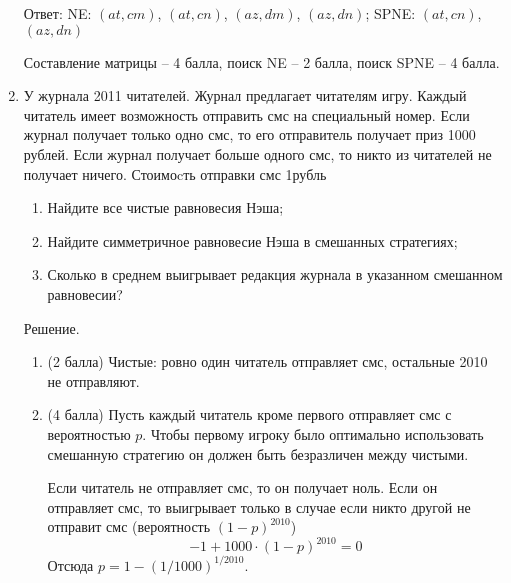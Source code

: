 \documentclass[pdftex,12pt,a4paper]{article}
\begin{document}
\begin{enumerate}

Ответ: NE: $(at,cm)$, $(at,cn)$, $(az,dm)$, $(az,dn)$;  SPNE: $(at,cn)$, $(az,dn)$ 


Составление матрицы -- 4 балла, поиск NE -- 2 балла, поиск SPNE -- 4 балла.

\item У журнала 2011 читателей. Журнал предлагает читателям игру. Каждый читатель имеет возможность отправить смс на специальный номер. Если журнал получает только одно смс, то его отправитель получает приз 1000 рублей. Если журнал получает больше одного смс, то никто из читателей не получает ничего. Стоимоcть отправки смс 1рубль
\begin{enumerate}
\item Найдите все чистые равновесия Нэша;
\item Найдите симметричное равновесие Нэша в смешанных стратегиях;
\item Сколько в среднем выигрывает редакция журнала в указанном смешанном равновесии?
\end{enumerate}
Решение.
\begin{enumerate}
\item (2 балла) Чистые: ровно один читатель отправляет смс, остальные 2010 не отправляют.
\item (4 балла) Пусть каждый читатель кроме первого отправляет смс с вероятностью $p$. Чтобы первому игроку было оптимально использовать смешанную стратегию он должен быть безразличен между чистыми.

Если читатель не отправляет смс, то он получает ноль. Если он отправляет смс, то выигрывает только в случае если никто другой не отправит смс (вероятность $(1-p)^{2010}$) 
\begin{equation}
\label{eq_foc}
-1+1000\cdot (1-p)^{2010}=0
\end{equation}
Отсюда $p=1-(1/1000)^{1/2010}$.


\end{enumerate}
\end{enumerate}
\end{document}
